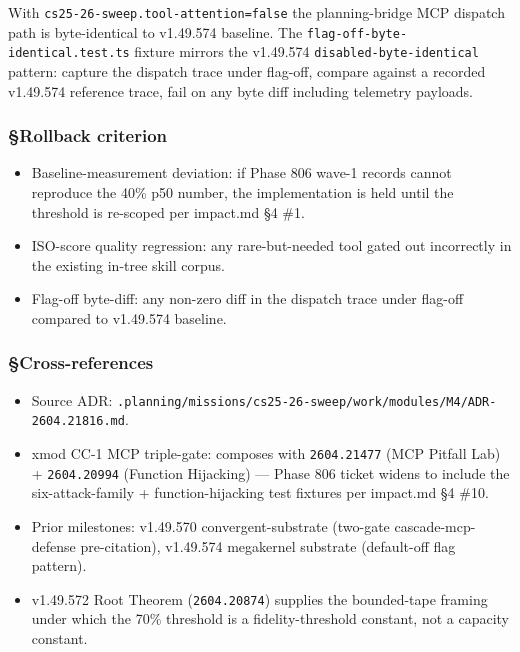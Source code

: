 \documentclass[11pt,letterpaper]{article}
\newcommand{\arxivid}[1]{\texttt{\textcolor{accent}{#1}}}
\providecommand{\tightlist}{\setlength{\itemsep}{0pt}\setlength{\parskip}{0pt}}
\begin{document}
With \texttt{cs25-26-sweep.tool-attention=false} the planning-bridge MCP
dispatch path is byte-identical to v1.49.574 baseline. The
\texttt{flag-off-byte-identical.test.ts} fixture mirrors the v1.49.574
\texttt{disabled-byte-identical} pattern: capture the dispatch trace
under flag-off, compare against a recorded v1.49.574 reference trace,
fail on any byte diff including telemetry payloads.

\subsubsection{§Rollback criterion}

\begin{itemize}
\tightlist
\item
  Baseline-measurement deviation: if Phase 806 wave-1 records cannot
  reproduce the 40\% p50 number, the implementation is held until the
  threshold is re-scoped per impact.md §4 \#1.
\item
  ISO-score quality regression: any rare-but-needed tool gated out
  incorrectly in the existing in-tree skill corpus.
\item
  Flag-off byte-diff: any non-zero diff in the dispatch trace under
  flag-off compared to v1.49.574 baseline.
\end{itemize}

\subsubsection{§Cross-references}

\begin{itemize}
\tightlist
\item
  Source ADR:
  \texttt{.planning/missions/cs25-26-sweep/work/modules/M4/ADR-\arxivid{2604.21816}.md}.
\item
  xmod CC-1 MCP triple-gate: composes with \arxivid{2604.21477} (MCP
  Pitfall Lab) + \arxivid{2604.20994} (Function Hijacking) --- Phase 806
  ticket widens to include the six-attack-family + function-hijacking
  test fixtures per impact.md §4 \#10.
\item
  Prior milestones: v1.49.570 convergent-substrate (two-gate
  cascade-mcp-defense pre-citation), v1.49.574 megakernel substrate
  (default-off flag pattern).
\item
  v1.49.572 Root Theorem (\arxivid{2604.20874}) supplies the bounded-tape
  framing under which the 70\% threshold is a fidelity-threshold
  constant, not a capacity constant.
\end{itemize}
\end{document}

